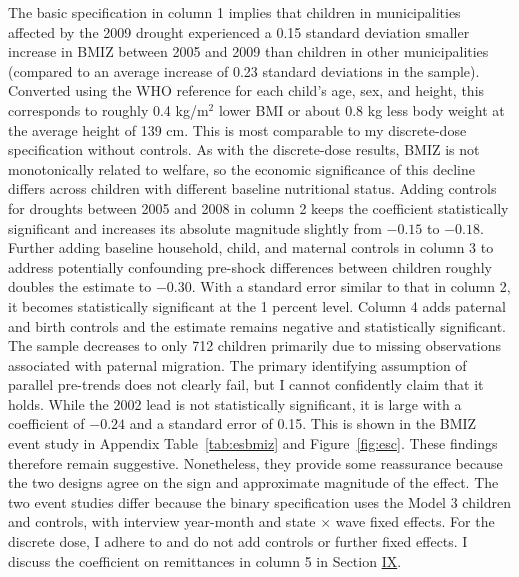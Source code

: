 \documentclass[12pt]{article}
\begin{document}
The basic specification in column 1 implies that children in municipalities affected by the 2009 drought experienced a 0.15 standard deviation smaller increase in BMIZ between 2005 and 2009 than children in other municipalities (compared to an average increase of 0.23 standard deviations in the sample). Converted using the WHO reference for each child's age, sex, and height, this corresponds to roughly 0.4 kg/m$^2$ lower BMI or about 0.8 kg less body weight at the average height of 139 cm. This is most comparable to my discrete-dose specification without controls. As with the discrete-dose results, BMIZ is not monotonically related to welfare, so the economic significance of this decline differs across children with different baseline nutritional status. Adding controls for droughts between 2005 and 2008 in column 2 keeps the coefficient statistically significant and increases its absolute magnitude slightly from $-0.15$ to $-0.18$. Further adding baseline household, child, and maternal controls in column 3 to address potentially confounding pre-shock differences between children roughly doubles the estimate to $-0.30$. With a standard error similar to that in column 2, it becomes statistically significant at the 1 percent level. Column 4 adds paternal and birth controls and the estimate remains negative and statistically significant. The sample decreases to only 712 children primarily due to missing observations associated with paternal migration. The primary identifying assumption of parallel pre-trends does not clearly fail, but I cannot confidently claim that it holds. While the 2002 lead is not statistically significant, it is large with a coefficient of $-0.24$ and a standard error of 0.15. This is shown in the BMIZ event study in Appendix Table~\ref{tab:esbmiz} and Figure~\ref{fig:esc}. These findings therefore remain suggestive. Nonetheless, they provide some reassurance because the two designs agree on the sign and approximate magnitude of the effect. The two event studies differ because the binary specification uses the Model 3 children and controls, with interview year-month and state $\times$ wave fixed effects. For the discrete dose, I adhere to \textcite{callawayDifferenceinDifferencesContinuousTreatment2024} and do not add controls or further fixed effects. I discuss the coefficient on remittances in column 5 in Section \hyperref[sec:IX]{IX}.
\end{document}

